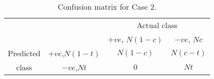 \documentclass{article}
\begin{document}
\begin{table}
\begin{center}
  \begin{tabular}{cccc}
    \cline{3-4}
    & & \multicolumn{2}{|c|}{Actual class}  \\
    \cline{3-4}
    & & \multicolumn{1}{|c|}{$+ve$, $N(1-c)$} &  \multicolumn{1}{|c|}{$-ve$, $Nc$}\\
    \hline
    \multicolumn{1}{|c}{Predicted} & \multicolumn{1}{|c|}{$+ve$,$N(1-t)$} & \multicolumn{1}{|c|}{$N(1-c)$} & \multicolumn{1}{|c|}{$N(c-t)$} \\
    \cline{2-4}
    \multicolumn{1}{|c}{class} & \multicolumn{1}{|c|}{$-ve$,$Nt$} & \multicolumn{1}{|c|}{$0$} & \multicolumn{1}{|c|}{$Nt$}\\
    \hline
  \end{tabular}
\end{center}
\caption{\label{tab:confcase1} Confusion matrix for Case 2.}
\end{table}\\
\end{document}
